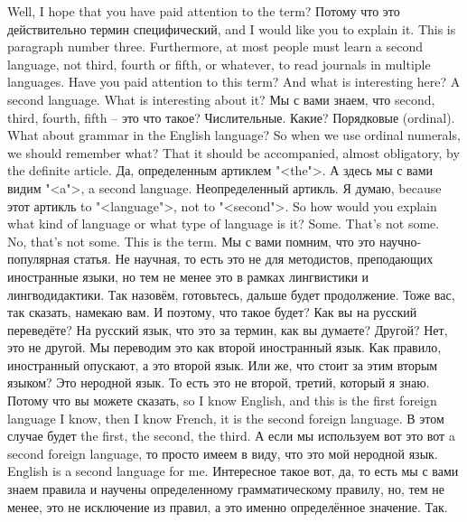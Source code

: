 \documentclass[main.tex]{subfiles}
\begin{document}
Well, I hope that you have paid attention to the term?
Потому что это действительно термин специфический, and I would like you to explain it.
This is paragraph number three.
Furthermore, at most people must learn a second language, not third, fourth or fifth, or whatever, to read journals in multiple languages.
Have you paid attention to this term?
And what is interesting here?
A second language.
What is interesting about it?
Мы с вами знаем, что second, third, fourth, fifth -- это что такое?
Числительные.
Какие?
Порядковые (ordinal).
What about grammar in the English language?
So when we use ordinal numerals, we should remember what?
That it should be accompanied, almost obligatory, by the definite article.
Да, определенным артиклем "<the">.
А здесь мы с вами видим "<a">, a second language.
Неопределенный артикль.
Я думаю, because этот артикль to "<language">, not to "<second">.
So how would you explain what kind of language or what type of language is it?
Some.
That's not some.
No, that's not some.
This is the term.
Мы с вами помним, что это научно-популярная статья.
Не научная, то есть это не для методистов, преподающих иностранные языки, но тем не менее это в рамках лингвистики и лингводидактики.
Так назовём, готовьтесь, дальше будет продолжение.
Тоже вас, так сказать, намекаю вам.
И поэтому, что такое будет?
Как вы на русский переведёте?
На русский язык, что это за термин, как вы думаете?
Другой?
Нет, это не другой.
Мы переводим это как второй иностранный язык.
Как правило, иностранный опускают, а это второй язык.
Или же, что стоит за этим вторым языком?
Это неродной язык.
То есть это не второй, третий, который я знаю.
Потому что вы можете сказать, so I know English, and this is the first foreign language I know, then I know French, it is the second foreign language.
В этом случае будет the first, the second, the third.
А если мы используем вот это вот a second foreign language, то просто имеем в виду, что это мой неродной язык.
English is a second language for me.
Интересное такое вот, да, то есть мы с вами знаем правила и научены определенному грамматическому правилу, но, тем не менее, это не исключение из правил, а это именно определённое значение.
Так.
\end{document}
